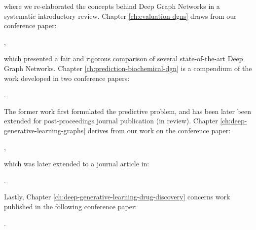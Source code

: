 \noindent where we re-elaborated the concepts behind Deep Graph Networks in a systematic introductory review. Chapter \ref{ch:evaluation-dgns} draws from our conference paper:

\vspace{1em}
,
\vspace{1em}

\noindent which presented a fair and rigorous comparison of several state-of-the-art Deep Graph Networks. Chapter \ref{ch:prediction-biochemical-dgn} is a compendium of the work developed in two conference papers:

\vspace{1em}

.
\vspace{1em}

\noindent The former work first formulated the predictive problem, and has been later been extended for post-proceedings journal publication (in review). Chapter \ref{ch:deep-generative-learning-graphs} derives from our work on the conference paper:

\vspace{1em}
,
\vspace{1em}

\noindent which was later extended to a journal article in:

\vspace{1em}
.
\vspace{1em}

\noindent Lastly, Chapter \ref{ch:deep-generative-learning-drug-discovery} concerns work published in the following conference paper:

\vspace{1em}
.
\vspace{1em}
